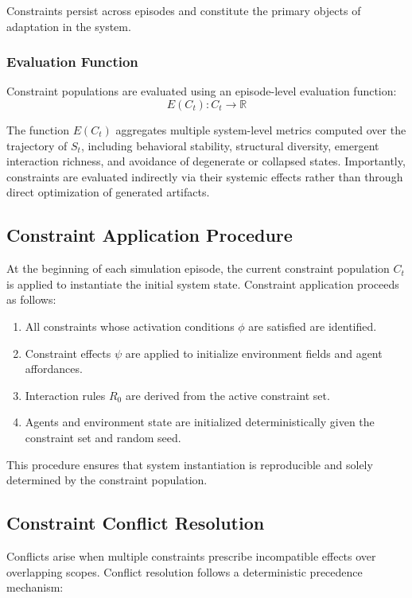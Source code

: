 Constraints persist across episodes and constitute the primary objects of adaptation in the system.

\subsubsection{Evaluation Function}

Constraint populations are evaluated using an episode-level evaluation function:
\[
E(C_t) : C_t \rightarrow \mathbb{R}
\]

The function $E(C_t)$ aggregates multiple system-level metrics computed over the trajectory of $S_t$, including behavioral stability, structural diversity, emergent interaction richness, and avoidance of degenerate or collapsed states. Importantly, constraints are evaluated indirectly via their systemic effects rather than through direct optimization of generated artifacts.

\subsection{Constraint Application Procedure}

At the beginning of each simulation episode, the current constraint population $C_t$ is applied to instantiate the initial system state. Constraint application proceeds as follows:

\begin{enumerate}
    \item All constraints whose activation conditions $\phi$ are satisfied are identified.
    \item Constraint effects $\psi$ are applied to initialize environment fields and agent affordances.
    \item Interaction rules $R_0$ are derived from the active constraint set.
    \item Agents and environment state are initialized deterministically given the constraint set and random seed.
\end{enumerate}

This procedure ensures that system instantiation is reproducible and solely determined by the constraint population.

\subsection{Constraint Conflict Resolution}

Conflicts arise when multiple constraints prescribe incompatible effects over overlapping scopes. Conflict resolution follows a deterministic precedence mechanism:

